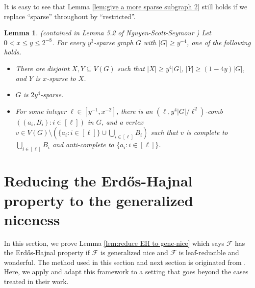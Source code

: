 \documentclass[a4paper,11pt]{article}
\newtheorem{lemma}[theorem]{Lemma}
\begin{document}
It is easy to see that Lemma \ref{lem:give a more sparse subgraph 2}
still holds if we replace ``sparse'' throughout by ``restricted''.


\begin{lemma}\label{lem:get a comb in a sparse graph}
\textnormal{(contained in Lemma 5.2 of Nguyen-Scott-Seymour \cite{NSS23})}
Let $0<x\leq y\leq 2^{-8}$. For every $y^3$-sparse graph $G$ with $|G|\geq y^{-4}$, one of the following holds.

\begin{itemize}
    \item There are disjoint $X,Y\subseteq V(G)$ such that $|X|\geq y^4|G|$, $|Y|\geq (1-4y)|G|$, and $Y$ is $x$-sparse to $X$.
    
    \item $G$ is $2y^4$-sparse.
    
    \item For some integer $\ell\in[y^{-1},x^{-2}]$, there is an $(\ell, y^4|G|/\ell^2)$-comb $((a_i,B_i):i\in[\ell])$ in $G$, and a vertex $v\in V(G)\setminus(\{a_i:i\in[\ell]\}\cup\bigcup_{i\in[\ell]}B_i)$ such that $v$ is complete to $\bigcup_{i\in[\ell]}B_i$ and anti-complete to $\{a_i:i\in[\ell]\}$.
\end{itemize}

\end{lemma}




    

\section{Reducing the Erd\H{o}s-Hajnal property to the generalized niceness}\label{sec:iterative-sparsification-2}

    In this section, we prove Lemma \ref{lem:reduce EH to gene-nice} which says $\mathcal{F}$ has the Erd\H{o}s-Hajnal property if $\mathcal{F}$ is generalized nice and $\mathcal{F}$ is leaf-reducible and wonderful. 
    The method used in this section and next section is originated from \cite{NSS23,NSS25}.
    Here, we apply and adapt this framework to a setting that goes beyond the cases treated in their work.
\end{document}
